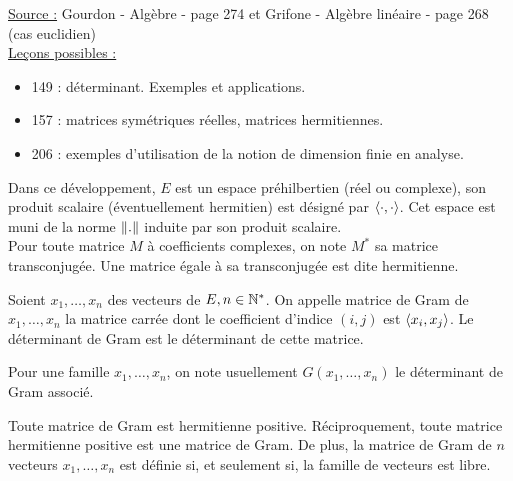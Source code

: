 

\pagestyle{fancy}

\fancyhead[R]{}



\underline{Source :} Gourdon - Algèbre - page 274 et Grifone - Algèbre linéaire - page 268 (cas euclidien) \\

\underline{Leçons possibles :} 
\begin{itemize}
\item 149 : déterminant. Exemples et applications.
\item 157 : matrices symétriques réelles, matrices hermitiennes.
\item 206 : exemples d'utilisation de la notion de dimension finie en analyse.
\end{itemize}

\begin{nota}
Dans ce développement, $E$ est un espace préhilbertien (réel ou complexe), son produit scalaire (éventuellement hermitien) 
est désigné par $\langle \cdot, \cdot\rangle$. 
Cet espace est muni de la norme $\lVert.\rVert$ induite par son produit scalaire. \\
Pour toute matrice $M$ à coefficients complexes, on note $M^{\ast}$ sa matrice transconjugée. 
Une matrice égale à sa transconjugée est dite hermitienne.
\end{nota}

\begin{defn}
Soient $x_1, \dots, x_n$ des vecteurs de $E, n \in \mathbb{N}^\ast$. 
On appelle matrice de Gram de $x_1, \dots, x_n$ la matrice carrée dont le coefficient d'indice $(i,j)$ est $\langle x_i, x_j\rangle$. 
Le déterminant de Gram est le déterminant de cette matrice.
\end{defn}

\begin{nota}
Pour une famille $x_1, \dots, x_n$, on note usuellement $G(x_1, \dots, x_n)$ le déterminant de Gram associé.
\end{nota}

\begin{thm}
Toute matrice de Gram est hermitienne positive. Réciproquement, toute matrice hermitienne positive est une matrice de Gram.
De plus, la matrice de Gram de $n$ vecteurs $x_1, \dots, x_n$ est définie si, et seulement si, la famille de vecteurs est libre.
\end{thm}

